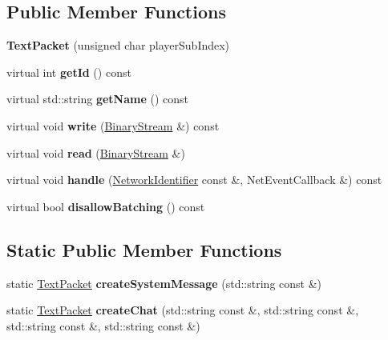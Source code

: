 \subsection*{Public Member Functions}
\begin{DoxyCompactItemize}
\item 
\mbox{\label{struct_text_packet_af8266837c559201af138a27a34f62f5f}} 
{\bfseries Text\+Packet} (unsigned char player\+Sub\+Index)
\item 
\mbox{\label{struct_text_packet_a3be09c982627b28c795f4e1ec296b7f3}} 
virtual int {\bfseries get\+Id} () const
\item 
\mbox{\label{struct_text_packet_a11e797b55efb9391d896c79163713795}} 
virtual std\+::string {\bfseries get\+Name} () const
\item 
\mbox{\label{struct_text_packet_a4b802de83fb8d64bc5768ae50e957c8e}} 
virtual void {\bfseries write} (\mbox{\hyperlink{struct_binary_stream}{Binary\+Stream}} \&) const
\item 
\mbox{\label{struct_text_packet_a091970de98cba5beac95d1918482f5b7}} 
virtual void {\bfseries read} (\mbox{\hyperlink{struct_binary_stream}{Binary\+Stream}} \&)
\item 
\mbox{\label{struct_text_packet_ab1d6597b4f6e18af361802aa583b1911}} 
virtual void {\bfseries handle} (\mbox{\hyperlink{struct_network_identifier}{Network\+Identifier}} const \&, Net\+Event\+Callback \&) const
\item 
\mbox{\label{struct_text_packet_a812848db08c7097de0f7a1b07bd94fbd}} 
virtual bool {\bfseries disallow\+Batching} () const
\end{DoxyCompactItemize}
\subsection*{Static Public Member Functions}
\begin{DoxyCompactItemize}
\item 
\mbox{\label{struct_text_packet_a0f49f6b306b5a92b359da06c887c087c}} 
static \mbox{\hyperlink{struct_text_packet}{Text\+Packet}} {\bfseries create\+System\+Message} (std\+::string const \&)
\item 
\mbox{\label{struct_text_packet_a22e70978f9d68eee1f39e802cf4b4670}} 
static \mbox{\hyperlink{struct_text_packet}{Text\+Packet}} {\bfseries create\+Chat} (std\+::string const \&, std\+::string const \&, std\+::string const \&, std\+::string const \&)
\end{DoxyCompactItemize}
